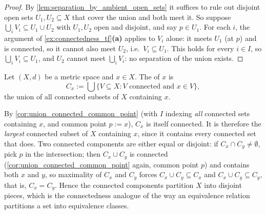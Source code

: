 \begin{proof}
By \cref{lem:separation_by_ambient_open_sets} it suffices to rule out disjoint open sets
$U_1, U_2 \subseteq X$ that cover the union and both meet it. So suppose
$\bigcup_i V_i \subseteq U_1 \cup U_2$ with $U_1,U_2$ open and disjoint, and say
$p \in U_1$. For each $i$, the argument of \cref{ex:connectedness_tf}\textbf{(a)} applies to
$V_i$ alone: it meets $U_1$ (at $p$) and is connected, so it cannot also meet $U_2$, i.e.\
$V_i \subseteq U_1$. This holds for every $i \in I$, so $\bigcup_i V_i \subseteq U_1$, and $U_2$
cannot meet $\bigcup_i V_i$: no separation of the union exists.
\end{proof}

\begin{definition}
\label{def:connected_component}
Let $(X,d)$ be a metric space and $x \in X$. The 
\germanfor{Zusammenhangskomponente} of $x$ is
\[C_x := \bigcup\{V \subseteq X : V \text{ connected and } x \in V\},\]
the union of all connected subsets of $X$ containing $x$.
\end{definition}

\begin{remark}
By \cref{cor:union_connected_common_point} (with $I$ indexing \emph{all} connected sets
containing $x$, and common point $p := x$), $C_x$ is itself connected. It is therefore the
\emph{largest} connected subset of $X$ containing $x$, since it contains every connected set
that does. Two connected components are either equal or disjoint: if $C_x \cap C_y \neq
\emptyset$, pick $p$ in the intersection; then $C_x \cup C_y$ is connected
(\cref{cor:union_connected_common_point} again, common point $p$) and contains both $x$ and $y$,
so maximality of $C_x$ and $C_y$ forces $C_x \cup C_y \subseteq C_x$ and
$C_x \cup C_y \subseteq C_y$, that is, $C_x = C_y$. Hence the connected components partition $X$
into disjoint pieces, which is the connectedness analogue of the way an equivalence relation
partitions a set into equivalence classes.
\end{remark}

